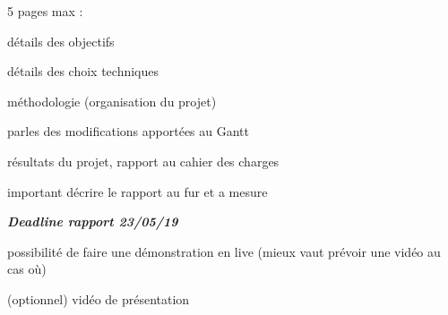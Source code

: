 \begin{DoxyItemize}
\item 5 pages max \+:
\begin{DoxyItemize}
\item détails des objectifs
\item détails des choix techniques
\item méthodologie (organisation du projet)
\item parles des modifications apportées au Gantt
\item résultats du projet, rapport au cahier des charges
\end{DoxyItemize}
\item important d\textquotesingle{}écrire le rapport au fur et a mesure
\item {\itshape {\bfseries Deadline rapport 23/05/19}}
\item possibilité de faire une démonstration en live (mieux vaut prévoir une vidéo au cas où)
\item (optionnel) vidéo de présentation 
\end{DoxyItemize}